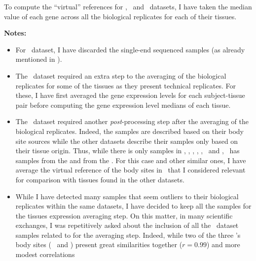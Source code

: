 To compute the \enquote{virtual} references for \vt, \uhlen\ and \gtex\ datasets,
I have taken the median value of each gene across all the
biological replicates for each of their tissues.\mybr\



\textbf{Notes:}
\begin{itemize}[topsep=0pt,nosep]
        \item For \ibm\ dataset, I have discarded the single-end sequenced samples
            (as already mentioned in ).
        \item The \uhlen\ dataset required an extra  step to
            the averaging of the biological replicates
            for some of the tissues as they present technical replicates.
            For these, I have first averaged the gene expression levels
            for each subject-tissue pair before computing
            the gene expression level medians of each tissue.
        \item The \gtex\ dataset required another \emph{post}-processing
            step after the averaging of the biological replicates.
            Indeed, the samples are described based on their
            body site sources while the other datasets describe their samples
            only based on their tissue origin.
            Thus, while there is only  samples in \castle, \vt,
            \ibm, \uhlen, \cutler, \kuster\ and \pandey,
            \gtex\ has samples from the 
            and from the .
            For this case and other similar ones,
            I have average the virtual reference of the body sites in \gtex\
            that I considered relevant for comparison with tissues found
            in the other datasets.
        \item While I have detected many samples that seem outliers to their
            biological replicates within the same datasets,
            I have decided to keep all the samples for the tissues expression
            averaging step. On this matter,
            in many scientific exchanges,
            I was repetitively asked about the inclusion of all the \gtex\ dataset samples
            related to \tissue{Oesophagus} for the averaging step.
            Indeed, while two of the three \gtex{}'s body sites
            (\ie\  and )
            present great similarities together ($r = 0.99$) and more modest correlations

\end{itemize}
